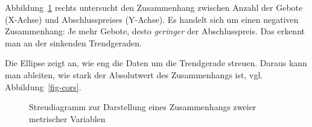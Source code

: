 \documentclass[
  letterpaper,
]{scrbook}
\theoremstyle{definition}
\theoremstyle{definition}
\theoremstyle{definition}
\theoremstyle{remark}
\begin{document}
Abbildung~\ref{fig-streu1} rechts untersucht den Zusammenhang zwischen
Anzahl der Gebote (X-Achse) und Abschlusspreises (Y-Achse). Es handelt
sich um einen negativen Zusammenhang: Je mehr Gebote, desto
\emph{geringer} der Abschlusspreis. Das erkennt man an der sinkenden
Trendgeraden.

Die Ellipse zeigt an, wie eng die Daten um die Trendgerade streuen.
Daraus kann man ableiten, wie stark der Absolutwert des Zusammenhangs
ist, vgl. Abbildung~\ref{fig-cors}.

\begin{figure}

\begin{minipage}{0.50\linewidth}



\end{minipage}%
%
\begin{minipage}{0.50\linewidth}



\end{minipage}%

\caption{\label{fig-streu1}Streudiagramm zur Darstellung eines
Zusammenhangs zweier metrischer Variablen}

\end{figure}%
\end{document}
